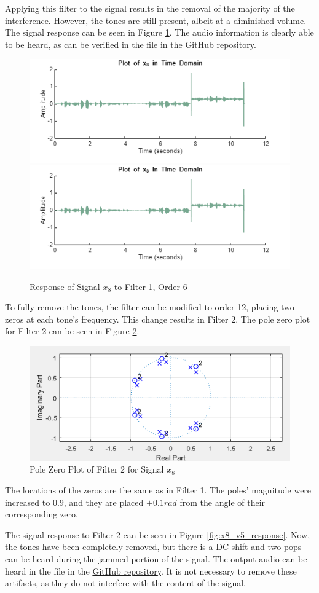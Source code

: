 Applying this filter to the signal results in the removal of the majority of the interference.  However, the tones are still present, albeit at a diminished volume.  The signal response can be seen in Figure \ref{fig:x8_v7_response}.  The audio information is clearly able to be heard, as can be verified in the  file in the \href{https://github.com/dbcometto/ece434_cpx2}{GitHub repository}.
\begin{figure}[H]
    \centering
    \includegraphics[width=0.5\linewidth]{figures/x8_filterv7.png}
    \includegraphics[width=0.5\linewidth]{figures/X8_filterv7.png}
    \caption{Response of Signal $x_8$ to Filter 1, Order 6}
    \label{fig:x8_v7_response}
\end{figure}

To fully remove the tones, the filter can be modified to order 12, placing two zeros at each tone's frequency.  This change results in Filter 2.  The pole zero plot for Filter 2 can be seen in Figure \ref{fig:x8_v5_polezero}.

\begin{figure}[H]
    \centering
    \includegraphics[width=0.5\linewidth]{figures/x8_v5_polezero.png}
    \caption{Pole Zero Plot of Filter 2 for Signal $x_8$}
    \label{fig:x8_v5_polezero}
\end{figure}

The locations of the zeros are the same as in Filter 1.  The poles' magnitude were increased to $0.9$, and they are placed $\pm 0.1 \unit{rad}$ from the angle of their corresponding zero.

The signal response to Filter 2 can be seen in Figure \ref{fig:x8_v5_response}.  Now, the tones have been completely removed, but there is a DC shift and two pops can be heard during the jammed portion of the signal.  The output audio can be heard in the  file in the \href{https://github.com/dbcometto/ece434_cpx2}{GitHub repository}.  It is not necessary to remove these artifacts, as they do not interfere with the content of the signal.

